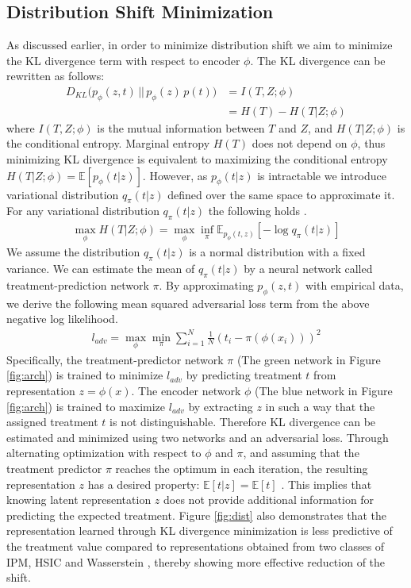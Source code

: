 \documentclass[letterpaper]{article} %
\begin{document}
\subsection{Distribution Shift Minimization}
As discussed earlier, in order to minimize distribution shift we aim to minimize the KL divergence term with respect to encoder $\phi$. The KL divergence can be rewritten as follows: 
\begin{align*}
   D_{KL}\bigg(p_{\phi}(z, t) \, || \, p_{\phi}(z)\,p(t)\bigg) &= I(T, Z; \phi) \\
&=H(T) - H(T|Z; \phi)
\end{align*}
where $I(T, Z; \phi)$ is the mutual information between $T$ and $Z$, and $H(T|Z; \phi)$ is the conditional entropy. Marginal entropy $H(T)$ does not depend on $\phi$, thus minimizing KL divergence is equivalent to maximizing the conditional entropy $H(T|Z; \phi) = \mathbb{E}[p_{\phi}(t|z)]$. However, as $p_{\phi}(t|z)$ is intractable we introduce variational distribution $q_{\pi}(t|z)$ defined over the same space to approximate it. 
For any variational distribution $q_\pi(t|z)$ the following holds \cite{aminmaxapproach}.
\begin{align*}
    \max_{\phi}H(T|Z; \phi) = \max_{\phi}\inf_{\pi} \mathbb{E}_{p_{\phi}(t, z)}[-\log q_{\pi}(t|z)]
\end{align*}
We assume the distribution $q_{\pi}(t|z)$ is a normal distribution with a fixed variance. We can estimate the mean of $q_\pi(t|z)$ by a neural network called treatment-prediction network $\pi$. By approximating $p_\phi(z, t)$ with empirical data, we derive the following mean squared adversarial loss term from the above negative log likelihood.
\begin{align*}
    l_{adv} = \max_{\phi} \min_{\pi} \sum_{i=1}^N \frac{1}{N} (t_i - \pi(\phi(x_i)))^2
\end{align*}
Specifically, the treatment-predictor network $\pi$ (The green network in Figure \ref{fig:arch}) is trained to minimize $l_{adv}$ by predicting treatment $t$ from representation $z = \phi(x)$. The encoder network $\phi$ (The blue network in Figure \ref{fig:arch}) is trained to maximize $l_{adv}$ by extracting $z$ in such a way that the assigned treatment $t$ is not distinguishable. Therefore KL divergence can be estimated and minimized using two networks and an adversarial loss. Through alternating optimization with respect to $\phi$ and $\pi$, and assuming that the treatment predictor $\pi$ reaches the optimum in each iteration, the resulting representation $z$ has a desired property: $\mathbb{E}[t|z] = \mathbb{E}[t]$ \cite{wang2020continuously}. This implies that knowing latent representation $z$ does not provide additional information for predicting the expected treatment.
Figure \ref{fig:dist} also demonstrates that the representation learned through KL divergence minimization is less predictive of the treatment value compared to representations obtained from two classes of IPM, HSIC \cite{HSIC} and Wasserstein \cite{Wasserstein}, thereby showing more effective reduction of the shift.
\end{document}
